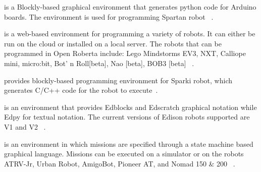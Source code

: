 

\parhead{\ardublockly} is a Blockly-based graphical environment that generates python code for Arduino boards. The environment is used for programming Spartan robot ~\cite{Spartan}.%

\parhead{\openroberta} is a web-based environment for programming a variety of robots. It can either be run on the cloud  or installed on a local server. The  robots that can be programmed in Open Roberta include: Lego Mindstorms EV3, NXT, Calliope mini, micro:bit, Bot' n Roll[beta], Nao [beta], BOB3 [beta] ~\cite{OpenRoberta,Jost2015,Ketterl2015}. %

\parhead{\arcbotics} provides blockly-based  programming environment for Sparki robot, which generates C/C++ code for the robot to execute~\cite{ArcboticSparki}. %

\parhead{\edison} is an environment that provides Edblocks and Edscratch graphical notation while Edpy for textual notation. The current versions of Edison robots supported are V1 and V2 ~\cite{Edison}.%

\parhead{\missionlab} is an environment in which missions are specified through a state machine based graphical language. Missions can be executed on a simulator or on the robots ATRV-Jr, Urban Robot, AmigoBot, Pioneer AT, and Nomad 150 \& 200  ~\cite{arkin2002missionlab,Ulam2007}.%

